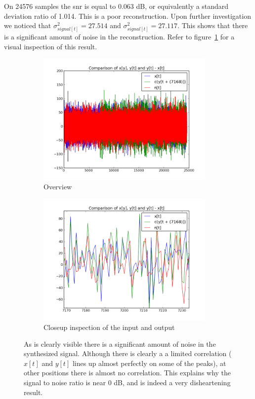 \documentclass[a4paper,10pt]{article}
\begin{document}
On 24576 samples the \gls{snr} is equal to 0.063 dB, or equivalently a standard deviation ratio of 1.014. This is a poor reconstruction. Upon further investigation we noticed that
$\sigma_{signal[t]}^2=27.514$ and $\sigma_{signal[t]}^2=27.117$. This shows that there is a significant amount of noise in the reconstruction. Refer to figure~\ref{snr} for a visual
inspection of this result.
\begin{figure}[ht!]
 \centering
 \begin{subfigure}{0.49\textwidth}
  \includegraphics[width=0.95\textwidth]{overview_snr}
  \caption{Overview}
 \end{subfigure}
 \begin{subfigure}{0.49\textwidth}
  \includegraphics[width=0.95\textwidth]{snr_zoomed.png}
  \caption{Closeup inspection of the input and output}
 \end{subfigure}
\caption[Reconstruction quality]{As is clearly visible there is a significant amount of noise in the synthesized signal. Although there is clearly a a limited correlation ($x[t]$ and $y[t]$ lines up 
almost perfectly on some of the peaks), at other positions there is almost no correlation. This explains why the signal to noise ratio is near 0 dB, and is indeed a very
disheartening result.}
\label{snr}
\end{figure}
\end{document}
